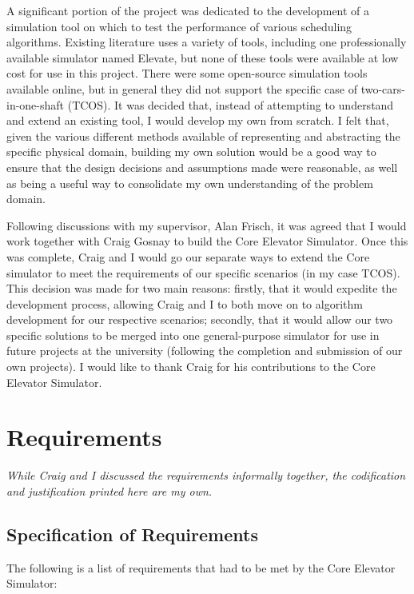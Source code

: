 \documentclass{UoYCSproject}
\begin{document}
A significant portion of the project was dedicated to the development of a simulation tool on which to test the performance of various scheduling algorithms.  Existing literature uses a variety of tools, including one professionally available simulator named Elevate, but none of these tools were available at low cost for use in this project.  There were some open-source simulation tools available online, but in general they did not support the specific case of two-cars-in-one-shaft (TCOS).  It was decided that, instead of attempting to understand and extend an existing tool, I would develop my own from scratch.  I felt that, given the various different methods available of representing and abstracting the specific physical domain, building my own solution would be a good way to ensure that the design decisions and assumptions made were reasonable, as well as being a useful way to consolidate my own understanding of the problem domain.

Following discussions with my supervisor, Alan Frisch, it was agreed that I would work together with Craig Gosnay to build the Core Elevator Simulator.  Once this was complete, Craig and I would go our separate ways to extend the Core simulator to meet the requirements of our specific scenarios (in my case TCOS).  This decision was made for two main reasons: firstly, that it would expedite the development process, allowing Craig and I to both move on to algorithm development for our respective scenarios; secondly, that it would allow our two specific solutions to be merged into one general-purpose simulator for use in future projects at the university (following the completion and submission of our own projects).  I would like to thank Craig for his contributions to the Core Elevator Simulator.

\section{Requirements}

\textit{While Craig and I discussed the requirements informally together, the codification and justification printed here are my own.}

\subsection{Specification of Requirements}

The following is a list of requirements that had to be met by the Core Elevator Simulator:
\end{document}
